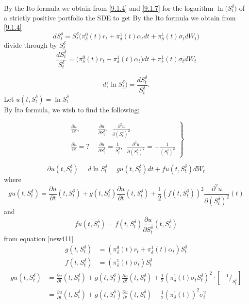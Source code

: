 \documentclass[a4 paper, 12pt]{report}
\newcommand*\rfrac[2]{{}^{#1}\!/_{#2}}
\theoremstyle{plain}
\begin{document}
By the Ito formula we obtain from \eqref{9.1.4} and \eqref{9.1.7} for the logarithm $\ln\bigg(S_t^\delta\bigg)$ 
of a strictly positive portfolio the SDE to get
By the Ito formula we obtain from \eqref{9.1.4}
$$
dS_t^\delta = S_t^\delta\bigg(\pi_\delta^0(t)r_t+\pi_\delta^1(t)\alpha_tdt+\pi_\delta^1(t)\sigma_tdW_t\bigg)
$$
divide through by $S_t^\delta$
\begin{equation}\label{new411}
\frac{dS_t^\delta}{S_t^\delta} = \bigg(\pi_\delta^0(t)r_t+\pi^1_\delta(t)\alpha_t\bigg)dt+\pi_\delta^1(t)\sigma_tdW_t
\end{equation}

\begin{equation}
d\bigg(\ln S_t^\delta\bigg) =  \frac{dS_t^\delta}{S_t^\delta}.
\end{equation}
Let $u(t,S_t^\delta) = \ln S_t^\delta$\\
By Ito formula, we wish to find the following;

\begin{equation}
\left.
\begin{split}
\frac{\partial u}{\partial t},&~~\frac{\partial u}{\partial S_t^\delta},~~\frac{\partial^2u}{\partial(S_t^\delta)^2}\\
\frac{\partial u}{\partial t} = ? &~~\frac{\partial u}{\partial S_t^\delta} = \frac{1}{S_t^\delta},~~\frac{\partial^2u}{\partial(S_t^\delta)^2} = -\frac{1}{(S_t^\delta)^2}
\end{split}
\right\}
\end{equation}

\begin{equation}\label{new415}
\partial u(t,S_t^\delta) = d\ln S_t^\delta = gu(t,S_t^\delta)dt+fu(t,S_t^\delta)dW_t
\end{equation}
where
$$
gu(t,S_t^\delta) = \frac{\partial u}{\partial t}(t,S_t^\delta)+g(t,S_t^\delta)\frac{\partial u}{\partial t}(t,S_t^\delta)+\frac{1}{2}(f(t,S_t^\delta))^2\frac{\partial^2u}{\partial(S_t^\delta)^2}(t)
$$
and 
$$
fu(t,S_t^\delta) = f(t,S_t^\delta)\frac{\partial u}{\partial S_t^\delta}(t,S_t^\delta)
$$
from equation \eqref{new411}
\begin{align*}
g(t,S_t^\delta) & = (\pi^0_\delta(t)r_t+\pi_\delta^1(t)\alpha_t)S_t^\delta\\
f(t,S_t^\delta) & = (\pi^1_\delta(t)\sigma_t)S_t^\delta%
\end{align*}
\begin{equation}\label{new418}
\begin{split}
gu(t,S_t^\delta) & = \frac{\partial u}{\partial t}(t,S_t^\delta)+g(t,S_t^\delta)\frac{\partial u}{\partial t}(t,S_t^\delta)+\frac{1}{2}(\pi_\delta^1(t)\sigma_tS_t^\delta)^2\cdot [-\rfrac{1}{S_t^\delta}]\\
& = \frac{\partial u}{\partial t}(t,S_t^\delta)+g(t,S_t^\delta)\frac{\partial u}{\partial t}(t,S_t^\delta) - \frac{1}{2}(\pi_\delta^1(t))^2\sigma_t^2
\end{split}
\end{equation}
\end{document}

